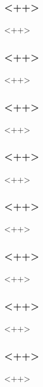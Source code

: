 \begin{frame}[fragile]
\frametitle{<++>}
<++>
\end{frame}

\begin{frame}[fragile]
\frametitle{<++>}
<++>
\end{frame}

\begin{frame}[fragile]
\frametitle{<++>}
<++>
\end{frame}

\begin{frame}[fragile]
\frametitle{<++>}
<++>
\end{frame}

\begin{frame}[fragile]
\frametitle{<++>}
<++>
\end{frame}

\begin{frame}[fragile]
\frametitle{<++>}
<++>
\end{frame}

\begin{frame}[fragile]
\frametitle{<++>}
<++>
\end{frame}

\begin{frame}[fragile]
\frametitle{<++>}
<++>
\end{frame}


